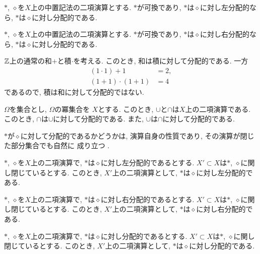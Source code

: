 \begin{cor}
  $\ast$, $\diamond$を$X$上の中置記法の二項演算とする.
  $\ast$が可換であり,
  $\ast$は$\diamond$に対し左分配的なら,
  $\ast$は$\diamond$に対し分配的である.
\end{cor}
\begin{cor}
  $\ast$, $\diamond$を$X$上の中置記法の二項演算とする.
  $\ast$が可換であり,
  $\ast$は$\diamond$に対し右分配的なら,
  $\ast$は$\diamond$に対し分配的である.
\end{cor}
\begin{example}
  $\mathbb{Z}$上の通常の和$+$と積$\cdot$を考える.
  このとき, 和は積に対して分配的である.
  一方
  \begin{align*}
    (1\cdot 1)+1&=2,\\
    (1+1)\cdot(1+1)&=4
  \end{align*}
  であるので, 積は和に対して分配的ではない.
\end{example}
\begin{example}
  $\Omega$を集合とし,
  $\Omega$の冪集合を
  $X$とする.
  このとき,
  $\cup$と$\cap$は$X$上の二項演算である.
  このとき,
  $\cap$は$\cup$に対して分配的である.
  また,
  $\cup$は$\cap$に対して分配的である.
\end{example}

$\ast$が$\diamond$に対して分配的であるかどうかは,
演算自身の性質であり,
その演算が閉じた部分集合でも自然に
成り立つ .
\begin{prop}
  $\ast$, $\diamond$を$X$上の二項演算で,
  $\ast$は$\diamond$に対し左分配的であるとする.
  $X'\subset X$は$\ast$, $\diamond$に関し閉じているとする.
  このとき,
  $X'$上の二項演算として,
  $\ast$は$\diamond$に対し左分配的である.
\end{prop}
\begin{prop}
  $\ast$, $\diamond$を$X$上の二項演算で,
  $\ast$は$\diamond$に対し右分配的であるとする.
  $X'\subset X$は$\ast$, $\diamond$に関し閉じているとする.
  このとき,
  $X'$上の二項演算として,
  $\ast$は$\diamond$に対し右分配的である.
\end{prop}
\begin{prop}
  $\ast$, $\diamond$を$X$上の二項演算で,
  $\ast$は$\diamond$に対し分配的であるとする.
  $X'\subset X$は$\ast$, $\diamond$に関し閉じているとする.
  このとき,
  $X'$上の二項演算として,
  $\ast$は$\diamond$に対し分配的である.
\end{prop}

